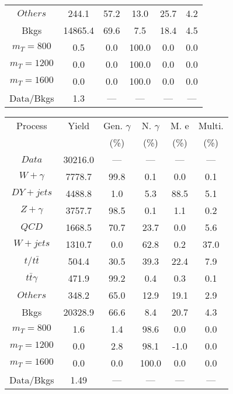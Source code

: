 \begin{figure}
\begin{minipage}[c]{0.32\textwidth}
{\begin{tabular}{cccccc}
$ Others $ &  244.1 &  57.2 &  13.0 &  25.7 &  4.2\\
Bkgs &  14865.4 &  69.6 &  7.5 &  18.4 &  4.5\\
$ m_{T} = 800 $ &  0.5 &  0.0 &  100.0 &  0.0 &  0.0\\
$ m_{T} = 1200 $ &  0.0 &  0.0 &  100.0 &  0.0 &  0.0\\
$ m_{T} = 1600 $ &  0.0 &  0.0 &  100.0 &  0.0 &  0.0\\
Data/Bkgs &  1.3 &  --- &  --- &  --- &  ---\\
\hline
\end{tabular}
}
\end{minipage}
\begin{minipage}[c]{0.32\textwidth}
\centering
\tiny{
\begin{tabular}{cccccc}
\hline
Process & Yield & Gen. $\gamma$ & N. $\gamma$ & M. e & Multi. \\
 &  & (\%) & (\%) & (\%) & (\%)  \\
\hline
                                                                      $ Data $ &  30216.0 &  --- &  --- &  --- &  ---\\
$ W+\gamma $ &  7778.7 &  99.8 &  0.1 &  0.0 &  0.1\\
$ DY+jets $ &  4488.8 &  1.0 &  5.3 &  88.5 &  5.1\\
$ Z+\gamma $ &  3757.7 &  98.5 &  0.1 &  1.1 &  0.2\\
$ QCD $ &  1668.5 &  70.7 &  23.7 &  0.0 &  5.6\\
$ W+jets $ &  1310.7 &  0.0 &  62.8 &  0.2 &  37.0\\
$ t/t\bar{t} $ &  504.4 &  30.5 &  39.3 &  22.4 &  7.9\\
$ t\bar{t}\gamma $ &  471.9 &  99.2 &  0.4 &  0.3 &  0.1\\
$ Others $ &  348.2 &  65.0 &  12.9 &  19.1 &  2.9\\
Bkgs &  20328.9 &  66.6 &  8.4 &  20.7 &  4.3\\
$ m_{T} = 800 $ &  1.6 &  1.4 &  98.6 &  0.0 &  0.0\\
$ m_{T} = 1200 $ &  0.0 &  2.8 &  98.1 &  -1.0 &  0.0\\
$ m_{T} = 1600 $ &  0.0 &  0.0 &  100.0 &  0.0 &  0.0\\
Data/Bkgs &  1.49 &  --- &  --- &  --- &  ---\\
\hline
\end{tabular}
}
\end{minipage}
\begin{minipage}[c]{0.32\textwidth}
\centering

\end{minipage}
\end{figure}

